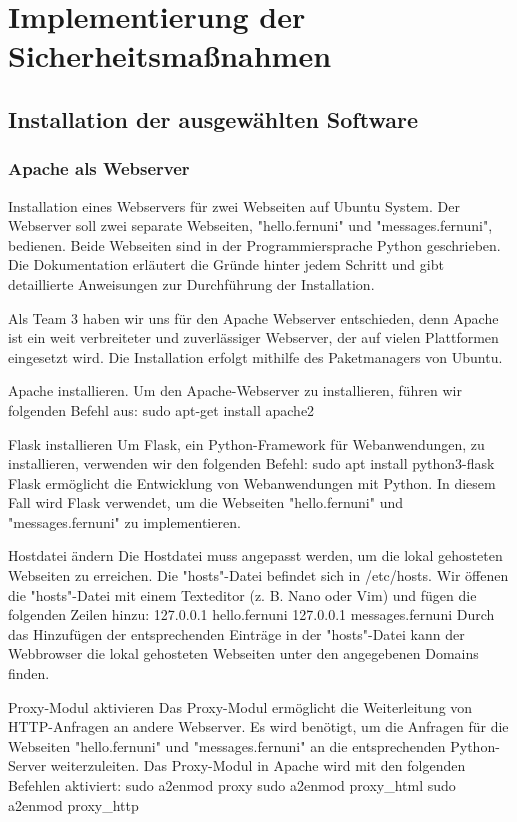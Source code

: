 \section{Implementierung der Sicherheitsmaßnahmen}

\subsection{Installation der ausgewählten Software}

\subsubsection{Apache als Webserver}

Installation eines Webservers für zwei Webseiten auf Ubuntu System.
Der Webserver soll zwei separate Webseiten, "hello.fernuni" und "messages.fernuni", bedienen. Beide Webseiten sind in der Programmiersprache Python geschrieben. Die Dokumentation erläutert die Gründe hinter jedem Schritt und gibt detaillierte Anweisungen zur Durchführung der Installation.

Als Team 3 haben wir uns für den Apache Webserver entschieden, denn Apache ist ein weit verbreiteter und zuverlässiger Webserver, der auf vielen Plattformen eingesetzt wird. Die Installation erfolgt mithilfe des Paketmanagers von Ubuntu.

Apache installieren.
Um den Apache-Webserver zu installieren, führen wir folgenden Befehl aus:
sudo apt-get install apache2

Flask installieren
Um Flask, ein Python-Framework für Webanwendungen, zu installieren, verwenden wir den folgenden Befehl:
sudo apt install python3-flask
Flask ermöglicht die Entwicklung von Webanwendungen mit Python. In diesem Fall wird Flask verwendet, um die Webseiten "hello.fernuni" und "messages.fernuni" zu implementieren.

Hostdatei ändern
Die Hostdatei muss angepasst werden, um die lokal gehosteten Webseiten zu erreichen. Die "hosts"-Datei befindet sich in /etc/hosts. Wir öffenen die "hosts"-Datei mit einem Texteditor (z. B. Nano oder Vim) und fügen die folgenden Zeilen hinzu:
127.0.0.1 	hello.fernuni
127.0.0.1 	messages.fernuni
Durch das Hinzufügen der entsprechenden Einträge in der "hosts"-Datei kann der Webbrowser die lokal gehosteten Webseiten unter den angegebenen Domains finden.

Proxy-Modul aktivieren
Das Proxy-Modul ermöglicht die Weiterleitung von HTTP-Anfragen an andere Webserver. Es wird benötigt, um die Anfragen für die Webseiten "hello.fernuni" und "messages.fernuni" an die entsprechenden Python-Server weiterzuleiten.
Das Proxy-Modul in Apache wird mit den folgenden Befehlen aktiviert:
sudo a2enmod proxy
sudo a2enmod proxy_html
sudo a2enmod proxy_http

